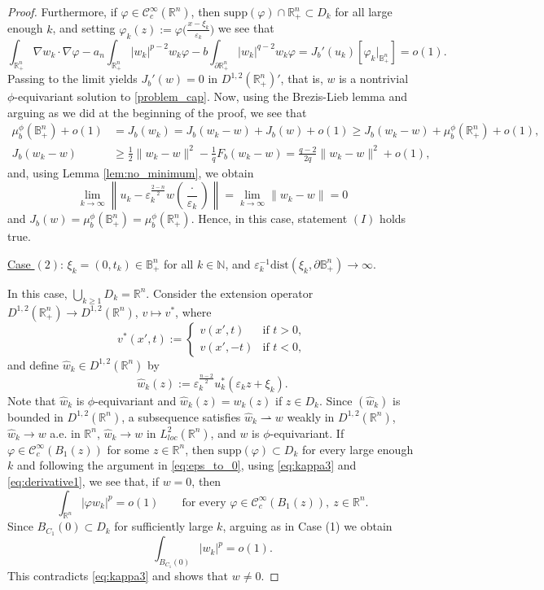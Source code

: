\documentclass[reqno,11pt,oneside]{amsart}
\numberwithin{equation}{section}
\def\D{\mathbb{B}^n_+}
\def\rn{\mathbb{R}^n}
\def\hn{\mathbb{R}^n_+}
\def\n{\mathbb{N}}
\def\eps{\varepsilon}
\def\rh{\rightharpoonup}
\def\irn{\int_{\rn}}
\def\ihn{\int_{\hn}}
\def\idhn{\int_{\partial\hn}}
\def\vp{\varphi}
\def\cC{\mathcal{C}}
\def\supp{\mathrm{supp}}
\def\what{\widehat}
\def\dist{\mathrm{dist}}
\begin{document}
\begin{proof}
Furthermore, if $\vp\in\cC^\infty_c(\rn)$, then $\supp(\vp)\cap\hn\subset D_k$ for all large enough $k$, and setting $\vp_k(z):=\vp\big(\frac{x-\xi_k}{\eps_k}\big)$ we see that
\begin{equation*}
\ihn\nabla w_k\cdot\nabla\vp-a_n\ihn|w_k|^{p-2}w_k\vp-b\idhn|w_k|^{q-2}w_k\vp = J_b'(u_k)[\vp_k|_{\D}]=o(1).
\end{equation*}
Passing to the limit yields $J_b'(w)=0$ in $D^{1,2}(\hn)'$, that is, $w$ is a nontrivial $\phi$-equivariant solution to \eqref{problem_cap}. Now, using the Brezis-Lieb lemma and arguing  as we did at the beginning of the proof, we see that
\begin{align}\label{eq:H1}
\mu^\phi_b(\D)+o(1)&=J_b(w_k)=J_b(w_k-w)+J_b(w)+o(1)\geq J_b(w_k-w)+\mu^\phi_b(\hn)+o(1), \\
J_b(w_k-w)&\geq\frac{1}{2}\|w_k-w\|^2-\frac{1}{q}F_b(w_k-w)=\frac{q-2}{2q}\|w_k-w\|^2+o(1),
\end{align}
and, using Lemma \ref{lem:no_minimum}, we obtain  
$$\lim_{k\to\infty}\left\|u_k-\eps_k^\frac{2-n}{2}w\left(\frac{\cdot}{\eps_k}\right)\right\|=\lim_{k\to\infty}\|w_k-w\| = 0$$
and $J_b(w)=\mu^\phi_b(\D)=\mu^\phi_b(\hn)$. Hence, in this case, statement $(I)$ holds true.

\underline{Case $(2)$}: $\xi_k=(0,t_k)\in\D$ for all $k\in\n$, and $\eps_k^{-1}\dist(\xi_k,\partial\D)\to\infty$.

In this case, $\bigcup_{k\geq 1}D_k=\rn$. Consider the extension operator $D^{1,2}(\hn)\to D^{1,2}(\rn)$,  $v\mapsto v^*$, where
\begin{equation*}
v^*(x',t):=
\begin{cases}
v(x',t) &\text{if \ }t>0,\\
v(x',-t) &\text{if \ }t<0,
\end{cases}
\end{equation*}
and define $\what w_k\in D^{1,2}(\rn)$ by
$$\what w_k(z):=\eps_k^\frac{n-2}{2}u_k^*(\eps_kz+\xi_k).$$
Note that $\what w_k$ is $\phi$-equivariant and $\what w_k(z)=w_k(z)$ if $z\in D_k$. Since $(\what w_k)$ is bounded in $D^{1,2}(\rn)$, a subsequence satisfies $\what w_k\rh w$ weakly in $D^{1,2}(\rn)$, $\what w_k\to w$ a.e. in $\rn$, $\what w_k\to w$ in $L^2_{loc}(\rn)$, and $w$ is $\phi$-equivariant. If $\vp\in\cC^\infty_c(B_1(z))$ for some $z\in\rn$, then $\supp(\vp)\subset D_k$ for every large enough $k$ and following the argument in \eqref{eq:eps_to_0}, using \eqref{eq:kappa3} and \eqref{eq:derivative1}, we see that, if $w=0$, then
$$\irn|\vp w_k|^p = o(1)\qquad\text{for every \ }\vp\in\cC^\infty_c(B_1(z)), \ z\in\rn.$$
Since $B_{C_1}(0)\subset D_k$ for sufficiently large $k$, arguing as in Case (1) we  obtain
$$\int_{B_{C_1}(0)}|w_k|^p=o(1).$$
This contradicts \eqref{eq:kappa3} and shows that $w\neq 0$.


\end{proof}
\end{document}
